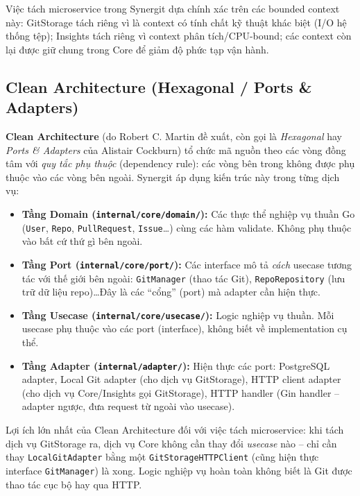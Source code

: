 Việc tách microservice trong Synergit dựa chính xác trên các bounded context này: GitStorage tách riêng vì là context có tính chất kỹ thuật khác biệt (I/O hệ thống tệp); Insights tách riêng vì context phân tích/CPU-bound; các context còn lại được giữ chung trong Core để giảm độ phức tạp vận hành.

\subsection{Clean Architecture (Hexagonal / Ports \& Adapters)}
\textbf{Clean Architecture} (do Robert C. Martin đề xuất, còn gọi là \textit{Hexagonal} hay \textit{Ports \& Adapters} của Alistair Cockburn) tổ chức mã nguồn theo các vòng đồng tâm với \textit{quy tắc phụ thuộc} (dependency rule): các vòng bên trong không được phụ thuộc vào các vòng bên ngoài. Synergit áp dụng kiến trúc này trong từng dịch vụ:

\begin{itemize}
\item \textbf{Tầng Domain (\texttt{internal/core/domain/}):} Các thực thể nghiệp vụ thuần Go (\texttt{User}, \texttt{Repo}, \texttt{PullRequest}, \texttt{Issue}\ldots) cùng các hàm validate. Không phụ thuộc vào bất cứ thứ gì bên ngoài.
\item \textbf{Tầng Port (\texttt{internal/core/port/}):} Các interface mô tả \textit{cách} usecase tương tác với thế giới bên ngoài: \texttt{GitManager} (thao tác Git), \texttt{RepoRepository} (lưu trữ dữ liệu repo)\ldots Đây là các ``cổng'' (port) mà adapter cần hiện thực.
\item \textbf{Tầng Usecase (\texttt{internal/core/usecase/}):} Logic nghiệp vụ thuần. Mỗi usecase phụ thuộc vào các port (interface), không biết về implementation cụ thể.
\item \textbf{Tầng Adapter (\texttt{internal/adapter/}):} Hiện thực các port: PostgreSQL adapter, Local Git adapter (cho dịch vụ GitStorage), HTTP client adapter (cho dịch vụ Core/Insights gọi GitStorage), HTTP handler (Gin handler -- adapter ngược, đưa request từ ngoài vào usecase).
\end{itemize}

Lợi ích lớn nhất của Clean Architecture đối với việc tách microservice: khi tách dịch vụ GitStorage ra, dịch vụ Core không cần thay đổi \textit{usecase} nào -- chỉ cần thay \texttt{LocalGitAdapter} bằng một \texttt{GitStorageHTTPClient} (cũng hiện thực interface \texttt{GitManager}) là xong. Logic nghiệp vụ hoàn toàn không biết là Git được thao tác cục bộ hay qua HTTP.

